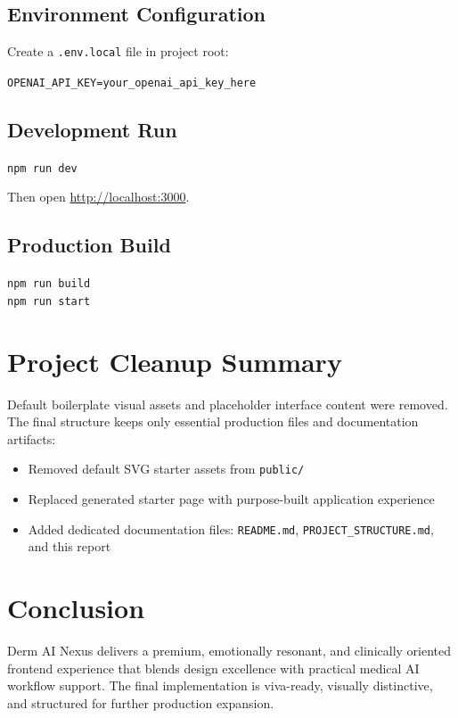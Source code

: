 \documentclass[12pt,a4paper]{article}
\begin{document}
\subsection{Environment Configuration}
Create a \texttt{.env.local} file in project root:
\begin{tcolorbox}[colback=richblack,colframe=crimson,boxrule=0.6pt]
\texttt{OPENAI\_API\_KEY=your\_openai\_api\_key\_here}
\end{tcolorbox}

\subsection{Development Run}
\begin{tcolorbox}[colback=richblack,colframe=trustcyan,boxrule=0.6pt]
\texttt{npm run dev}
\end{tcolorbox}
Then open \url{http://localhost:3000}.

\subsection{Production Build}
\begin{tcolorbox}[colback=richblack,colframe=crimson,boxrule=0.6pt]
\texttt{npm run build}\\
\texttt{npm run start}
\end{tcolorbox}

\section{Project Cleanup Summary}
Default boilerplate visual assets and placeholder interface content were removed. The final structure keeps only essential production files and documentation artifacts:
\begin{itemize}[leftmargin=1.5em]
    \item Removed default SVG starter assets from \texttt{public/}
    \item Replaced generated starter page with purpose-built application experience
    \item Added dedicated documentation files: \texttt{README.md}, \texttt{PROJECT\_STRUCTURE.md}, and this report
\end{itemize}

\section{Conclusion}
Derm AI Nexus delivers a premium, emotionally resonant, and clinically oriented frontend experience that blends design excellence with practical medical AI workflow support. The final implementation is viva-ready, visually distinctive, and structured for further production expansion.
\end{document}
